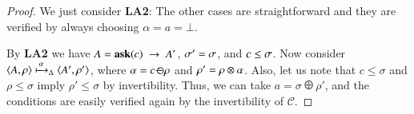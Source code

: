 \documentclass[main.tex]{subfiles}
\begin{document}
\begin{proof}%
	We just consider {\bf LA2}: The other cases are straightforward
	and they are verified by always choosing $\alpha = a = \bot$.
	
	By \textbf{LA2} we have $A = {\bf ask}(c) \ \rightarrow \ A'$, $\sigma' = \sigma$, and $c \leq \sigma$.
	Now consider $\langle A,\rho \rangle \xmapsto{\,\alpha\,}_\Delta \langle A',\rho' \rangle$, where 
	$\alpha = c \, {\ominus\hspace{-7.8pt} \div} \, \rho$ and $\rho' = \rho \otimes \alpha$.
	Also, let us note that $c \leq \sigma$ and $\rho \leq \sigma$ imply $\rho' \leq \sigma$
	by invertibility.
	Thus, we can take $a = \sigma \odiv \rho'$, and the conditions 
	are easily verified again by the invertibility of $\mathcal{C}$.
%	

\end{proof}
\end{document}
